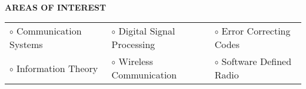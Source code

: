 \documentclass[a4paper,10pt]{article}
\begin{document}
{\qquad \\ \\ \\ \\ \\ \\ \\ \\ \\ \\ \\ \\ \\}


\colorbox{titleColor}{\parbox{6.5in}{\textbf{AREAS OF INTEREST}}}

%

\begin{tabular}{p{2in}p{2in}p{2in}}
    $\circ$ Communication Systems        &$\circ$ Digital Signal Processing		&$\circ$ Error Correcting Codes \\
    $\circ$ Information Theory       	  &$\circ$ Wireless Communication  		&$\circ$ Software Defined Radio \\
  \end{tabular}
\end{document}
